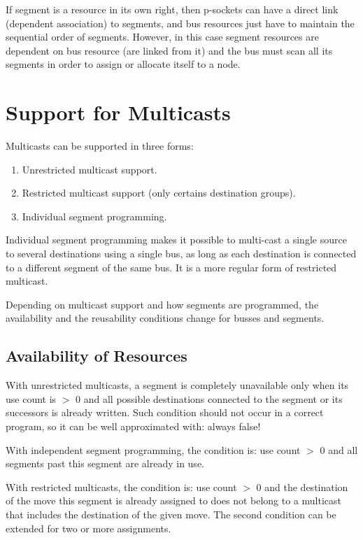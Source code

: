 \documentclass[a4paper,twoside]{tce}
\begin{document}
If segment is a resource in its own right, then p-sockets can have a direct
link (dependent association) to segments, and bus resources just have to
maintain the sequential order of segments. However, in this case segment
resources are dependent on bus resource (are linked from it) and the bus
must scan all its segments in order to assign or allocate itself to a node.

\section{Support for Multicasts}
\label{ch:pending:multicast-support}

Multicasts can be supported in three forms:
\begin{enumerate}
\item %
  Unrestricted multicast support.
\item %
  Restricted multicast support (only certains destination groups).
\item %
  Individual segment programming.
\end{enumerate}

Individual segment programming makes it possible to multi-cast a single
source to several destinations using a single bus, as long as each
destination is connected to a different segment of the same bus. It is a
more regular form of restricted multicast.

Depending on multicast support and how segments are programmed, the
availability and the reusability conditions change for busses and segments.

\subsection{Availability of Resources}

With unrestricted multicasts, a segment is completely unavailable only when
its use count is $>$ 0 and all possible destinations connected to the
segment or its successors is already written. Such condition should not
occur in a correct program, so it can be well approximated with: always
false!

With independent segment programming, the condition is: use count $>$ 0 and
all segments past this segment are already in use.

With restricted multicasts, the condition is: use count $>$ 0 and the
destination of the move this segment is already assigned to does not belong
to a multicast that includes the destination of the given move. The second
condition can be extended for two or more assignments.
\end{document}
